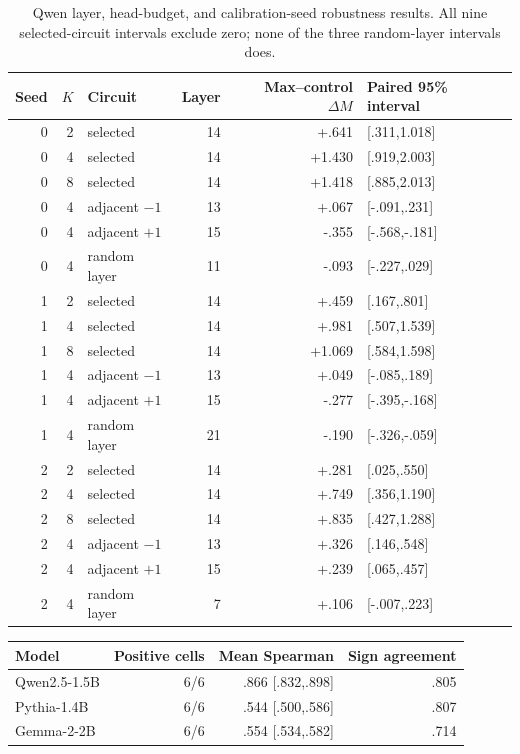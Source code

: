\documentclass[letterpaper]{article} %
\begin{document}
\begin{table}[t]
\centering
\small
\setlength{\tabcolsep}{3.0pt}
\begin{tabular}{rrlrrl}
\toprule
Seed & $K$ & Circuit & Layer & Max--control $\Delta M$ & Paired 95\% interval \\
\midrule
0 & 2 & selected & 14 & +.641 & [.311,1.018] \\
0 & 4 & selected & 14 & +1.430 & [.919,2.003] \\
0 & 8 & selected & 14 & +1.418 & [.885,2.013] \\
0 & 4 & adjacent $-1$ & 13 & +.067 & [-.091,.231] \\
0 & 4 & adjacent $+1$ & 15 & -.355 & [-.568,-.181] \\
0 & 4 & random layer & 11 & -.093 & [-.227,.029] \\
\midrule
1 & 2 & selected & 14 & +.459 & [.167,.801] \\
1 & 4 & selected & 14 & +.981 & [.507,1.539] \\
1 & 8 & selected & 14 & +1.069 & [.584,1.598] \\
1 & 4 & adjacent $-1$ & 13 & +.049 & [-.085,.189] \\
1 & 4 & adjacent $+1$ & 15 & -.277 & [-.395,-.168] \\
1 & 4 & random layer & 21 & -.190 & [-.326,-.059] \\
\midrule
2 & 2 & selected & 14 & +.281 & [.025,.550] \\
2 & 4 & selected & 14 & +.749 & [.356,1.190] \\
2 & 8 & selected & 14 & +.835 & [.427,1.288] \\
2 & 4 & adjacent $-1$ & 13 & +.326 & [.146,.548] \\
2 & 4 & adjacent $+1$ & 15 & +.239 & [.065,.457] \\
2 & 4 & random layer & 7 & +.106 & [-.007,.223] \\
\bottomrule
\end{tabular}
\caption{Qwen layer, head-budget, and calibration-seed robustness results. All nine selected-circuit
intervals exclude zero; none of the three random-layer intervals does.}
\label{tab:supp-selection-robustness}
\end{table}

\noindent\begin{minipage}{\columnwidth}
\centering
\small
\setlength{\tabcolsep}{3.0pt}
\begin{tabular}{lrrr}
\toprule
Model & Positive cells & Mean Spearman & Sign agreement \\
\midrule
Qwen2.5-1.5B & 6/6 & .866 [.832,.898] & .805 \\
Pythia-1.4B & 6/6 & .544 [.500,.586] & .807 \\
Gemma-2-2B & 6/6 & .554 [.534,.582] & .714 \\
\bottomrule
\end{tabular}
\label{tab:supp-utility-replication}
\end{minipage}\par\medskip
\end{document}
